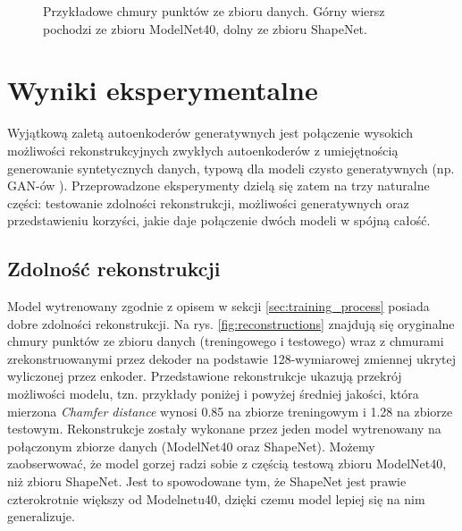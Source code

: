 \documentclass{iithesis}
\begin{document}
\begin{figure}[t]
    \caption{\label{fig:data_samples} Przykładowe chmury punktów ze zbioru danych.
    Górny wiersz pochodzi ze zbioru ModelNet40, dolny ze zbioru ShapeNet. }
\end{figure}

\chapter{Wyniki eksperymentalne}
Wyjątkową zaletą autoenkoderów generatywnych jest połączenie wysokich możliwości rekonstrukcyjnych
zwykłych autoenkoderów z umiejętnością generowanie syntetycznych danych, typową dla modeli
czysto generatywnych (np. GAN-ów \cite{gan}). Przeprowadzone eksperymenty dzielą się zatem
na trzy naturalne części: testowanie zdolności rekonstrukcji, możliwości generatywnych
oraz przedstawieniu korzyści, jakie daje połączenie dwóch modeli w spójną całość.

\section{Zdolność rekonstrukcji}
Model wytrenowany zgodnie z opisem w sekcji \ref{sec:training_process} posiada dobre zdolności
rekonstrukcji. Na rys. \ref{fig:reconstructions}
znajdują się oryginalne chmury punktów ze zbioru danych (treningowego i testowego)
wraz z chmurami zrekonstruowanymi przez dekoder na podstawie 128-wymiarowej zmiennej ukrytej wyliczonej przez enkoder.
Przedstawione rekonstrukcje ukazują przekrój możliwości modelu, tzn. przykłady poniżej i powyżej średniej jakości,
która mierzona \textit{Chamfer distance} wynosi 0.85 na zbiorze treningowym i 1.28 na zbiorze testowym.
Rekonstrukcje zostały wykonane przez jeden model wytrenowany na połączonym zbiorze danych (ModelNet40 oraz ShapeNet).
Możemy zaobserwować, że model gorzej radzi sobie z częścią testową zbioru ModelNet40, niż zbioru ShapeNet.
Jest to spowodowane tym, że ShapeNet jest prawie czterokrotnie większy od Modelnetu40, dzięki czemu model lepiej
się na nim generalizuje.
\end{document}

